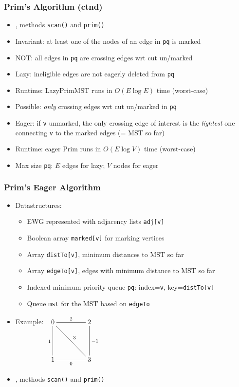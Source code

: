 \documentclass[handout]{beamer}
\begin{document}
\begin{frame}
    \frametitle{Prim's Algorithm (ctnd)}

\begin{itemize}[<+->]
\item \href{http://algs4.cs.princeton.edu/code/edu/princeton/cs/algs4/LazyPrimMST.java.html}%
{\color{red}{LazyPrimMST.java}}, methods {\tt scan()} and {\tt prim()}
\item Invariant: at least one of the nodes of an edge in {\tt pq} is marked
\item NOT: all edges in {\tt pq} are crossing edges wrt cut un/marked
\item Lazy: ineligible edges are not eagerly deleted from {\tt pq}
\item Runtime: LazyPrimMST runs in $O(E\log E)$ time (worst-case)
\item Possible: \emph{only} crossing edges wrt cut un/marked  in {\tt pq}
\item Eager: if {\tt v} unmarked, the only crossing edge of interest is the
\emph{lightest} one connecting {\tt v} to the marked edges (= MST so far)
\item Runtime: eager Prim runs in $O(E\log V)$ time (worst-case)
\item Max size {\tt pq}: $E$ edges for lazy; $V$ nodes for eager
\end{itemize} 
\end{frame}

\begin{frame}\label{EWGexample}
    \frametitle{Prim's Eager Algorithm}

\begin{itemize}[<+->]
\item Datastructures:
  \begin{itemize}
  \item EWG represented with adjacency lists {\tt adj[v]}
  \item Boolean array {\tt marked[v]} for marking vertices
  \item Array {\tt distTo[v]}, minimum distances to MST so far
  \item Array {\tt edgeTo[v]}, edges with minimum distance to MST so far
  \item Indexed minimum priority queue {\tt pq}: index={\tt v}, key={\tt distTo[v]}
  \item Queue {\tt mst} for the MST  based on {\tt edgeTo}
\end{itemize}
\item Example: $\xymatrix@R=1.5cm@C=1.5cm{
0\ar@{-}[r]^2 \ar@{-}[d]_1 \ar@{-}[rd]^3 &2 \ar@{-}[d]^{-1}\\1\ar@{-}[r]_0  &3 }$
\item \href{http://algs4.cs.princeton.edu/code/edu/princeton/cs/algs4/PrimMST.java.html}%
{\color{red}{PrimMST.java}}, methods {\tt scan()} and {\tt prim()}
\end{itemize} 
\end{frame}
\end{document}
